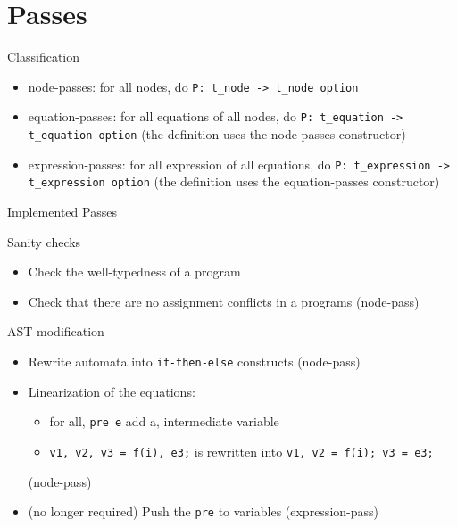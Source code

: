 \documentclass{beamer}
\begin{document}
\section{Passes}
\begin{frame}{}
    \begin{block}{Classification}
        \begin{itemize}
            \item node-passes: for all nodes, do \texttt{P: t\_node -> t\_node
            option}
            \pause
            \item equation-passes: for all equations of all nodes, do
            \texttt{P: t\_equation -> t\_equation option}
            (the definition uses the node-passes constructor)
            \pause
            \item expression-passes: for all expression of all equations, do
            \texttt{P: t\_expression -> t\_expression option}
            (the definition uses the equation-passes constructor)
        \end{itemize}
    \end{block}
\end{frame}
\begin{frame}{Implemented Passes}
	\begin{block}{Sanity checks}
		\begin{itemize}
			\item Check the well-typedness of a program
            \pause
			\item Check that there are no assignment conflicts in a programs
            (node-pass)
		\end{itemize}
	\end{block}
	\begin{block}{AST modification}
		\begin{itemize}
			\item Rewrite automata into \texttt{if-then-else} constructs
            (node-pass)
            \pause
			\item Linearization of the equations:
            \begin{itemize}
                \item for all, \texttt{pre e} add a, intermediate variable
                \item \texttt{v1, v2, v3 = f(i), e3;} is rewritten into
                \texttt{v1, v2 = f(i); v3 = e3;}
            \end{itemize}
            (node-pass)
            \pause
			\item (no longer required) Push the \texttt{pre} to variables
            (expression-pass)
		\end{itemize}
	\end{block}
\end{frame}
\end{document}

